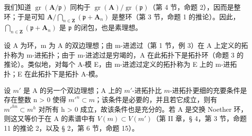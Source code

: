 	我们知道 \(\operatorname{gr}(\mathbf{A} / \mathfrak{p})\) 同构于 \(\operatorname{gr}(\mathbf{A}) / \operatorname{gr}(\mathfrak{p})\)（第 4 节，命题 2），因而是整环；于是可知 \(\mathbf{A} / \bigcap_{n\in \mathbf{Z}}(\mathfrak{p} + \mathbf{A}_n)\) 是整环（第 3 节，命题 1 的推论）。因此，\(\bigcap_{n\in \mathbf{Z}}(\mathfrak{p} + \mathbf{A}_n)\) 是 \(\mathfrak{p}\) 的闭包，也是素理想。

设 A 为环，m 为 A 的双边理想；由 m-进滤过（第 1 节，例 3）在 A 上定义的拓扑称为 m-进拓扑；由于 m-进滤过是穷竭的，A 在此拓扑下是拓扑环（命题 3 的推论）。类似地，对每个 A-模 E，由 m-进滤过定义的拓扑称为 E 上的 m-进拓扑；E 在此拓扑下是拓扑 A-模。

	设 \(m'\) 是 A 的另一个双边理想；A 上的 \(m'\)-进拓扑比 \(m\)-进拓扑更细的充要条件是存在整数 n \textgreater{} 0 使得 \(m'^n \subset m\)；该条件是必要的，并且若它成立，则有 \(m'^{hn} \subset m^h\) 对所有 h \textgreater{} 0 成立，故该条件也是充分的。若 A 是交换 Noether 环，则这又等价于在 A 的素谱中有 \(V(m) \subset V(m')\)（第 II 章，§ 4，第 3 节，命题 11 的推论 2，以及 § 2，第 6 节，命题 15）。

